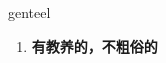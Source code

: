 
\begin{frame}
{\huge genteel}
\begin{center}
\begin{enumerate}\Large
  \item \textbf{有教养的，不粗俗的}
\end{enumerate}
\end{center}
\end{frame}
